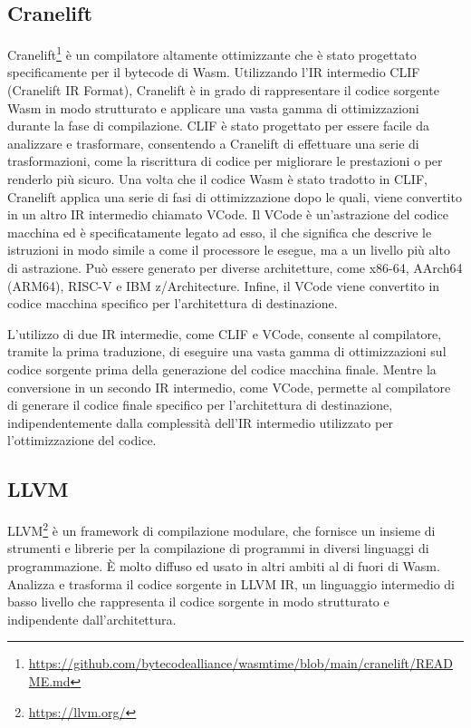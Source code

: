 \subsection{Cranelift}
Cranelift\footnote{\url{https://github.com/bytecodealliance/wasmtime/blob/main/cranelift/README.md}} è un compilatore
altamente ottimizzante che è stato progettato specificamente per il bytecode di Wasm. Utilizzando l'IR intermedio CLIF
(Cranelift IR Format), Cranelift è in grado di rappresentare il codice sorgente Wasm in modo strutturato e applicare una
vasta gamma di ottimizzazioni durante la fase di compilazione. CLIF è stato progettato per essere facile da analizzare e
trasformare, consentendo a Cranelift di effettuare una serie di trasformazioni, come la riscrittura di codice per
migliorare le prestazioni o per renderlo più sicuro. Una volta che il codice Wasm è stato tradotto in CLIF, Cranelift
applica una serie di fasi di ottimizzazione dopo le quali, viene convertito in un altro IR intermedio chiamato VCode. Il
VCode è un'astrazione del codice macchina ed è specificatamente legato ad esso, il che significa che descrive le
istruzioni in modo simile a come il processore le esegue, ma a un livello più alto di astrazione. Può essere generato
per diverse architetture, come x86-64, AArch64 (ARM64), RISC-V e IBM z/Architecture. Infine, il VCode viene convertito
in codice macchina specifico per l'architettura di destinazione.

L'utilizzo di due IR intermedie, come CLIF e VCode, consente al compilatore, tramite la prima traduzione, di eseguire
una vasta gamma di ottimizzazioni sul codice sorgente prima della generazione del codice macchina finale. Mentre la
conversione in un secondo IR intermedio, come VCode, permette al compilatore di generare il codice finale specifico per
l'architettura di destinazione, indipendentemente dalla complessità dell'IR intermedio utilizzato per l'ottimizzazione
del codice. 

\subsection{LLVM}
LLVM\footnote{\url{https://llvm.org/}} è un framework di compilazione modulare, che fornisce un insieme di strumenti e
librerie per la compilazione di programmi in diversi linguaggi di programmazione. È molto diffuso ed usato in altri
ambiti al di fuori di Wasm. Analizza e trasforma il codice sorgente in LLVM IR, un linguaggio intermedio di basso
livello che rappresenta il codice sorgente in modo strutturato e indipendente dall'architettura.

